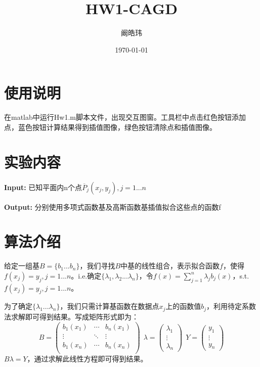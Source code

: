 \documentclass[12pt]{article}
\begin{document}
\title {HW1-CAGD}
\date{\today}
\author{阚皓玮}
\maketitle
\section{使用说明}
在matlab中运行Hw1.m脚本文件，出现交互图窗。工具栏中点击红色按钮添加点，蓝色按钮计算结果得到插值图像，绿色按钮清除点和插值图像。

\section{实验内容}
 {\bf Input:} 已知平面内n个点$\overline{P}_j(x_j,y_j),j=1...n$

{\bf Output:} 分别使用多项式函数基及高斯函数基插值拟合这些点的函数f

\section{算法介绍}
给定一组基$B=\{b_1...b_n\}$，我们寻找$B$中基的线性组合，表示拟合函数$f$，使得$f(x_j)=y_j,j=1...n$。i.e.确定$\{\lambda_1,\lambda_2...\lambda_n\}$，令$f(x)=\sum_{j=1}^n\lambda_jb_j(x)$，s.t. $f(x_j)=y_j,j=1...n$。

为了确定$\{\lambda_1...\lambda_n\}$，我们只需计算基函数在数据点$x_j$上的函数值$b_j$，利用待定系数法求解即可得到结果。写成矩阵形式即为：
\begin{equation}
    B=\left(
    \begin{array}{ccc}
            b_1(x_1) & \cdots & b_n(x_1) \\
            \vdots   & \ddots & \vdots   \\
            b_1(x_n) & \cdots & b_n(x_n) \\
        \end{array}
    \right)\ \ \lambda=\left(
    \begin{array}{c}
            \lambda_1 \\
            \vdots    \\
            \lambda_n
        \end{array}
    \right)\ \ Y=\left(
    \begin{array}{c}
            y_1    \\
            \vdots \\
            y_n
        \end{array}
    \right)
\end{equation}
$B\lambda=Y$，通过求解此线性方程即可得到结果。
\end{document}
